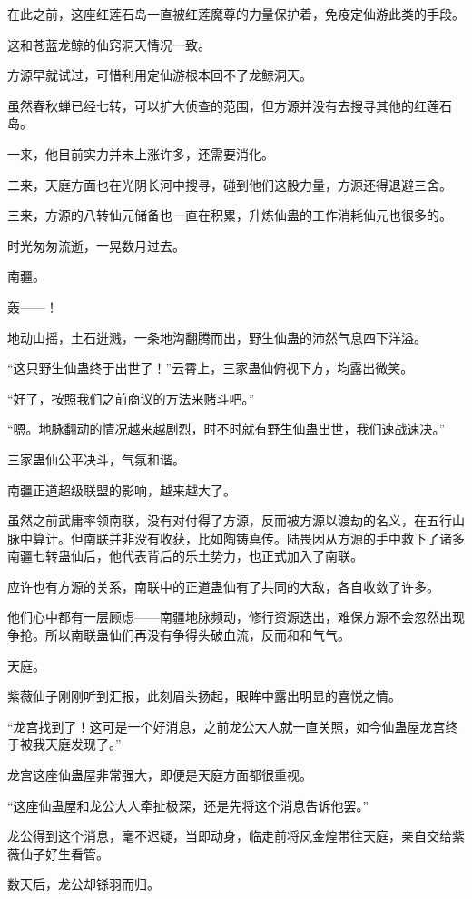 \begin{this_body}
在此之前，这座红莲石岛一直被红莲魔尊的力量保护着，免疫定仙游此类的手段。

这和苍蓝龙鲸的仙窍洞天情况一致。

方源早就试过，可惜利用定仙游根本回不了龙鲸洞天。

虽然春秋蝉已经七转，可以扩大侦查的范围，但方源并没有去搜寻其他的红莲石岛。

一来，他目前实力并未上涨许多，还需要消化。

二来，天庭方面也在光阴长河中搜寻，碰到他们这股力量，方源还得退避三舍。

三来，方源的八转仙元储备也一直在积累，升炼仙蛊的工作消耗仙元也很多的。

时光匆匆流逝，一晃数月过去。

南疆。

轰——！

地动山摇，土石迸溅，一条地沟翻腾而出，野生仙蛊的沛然气息四下洋溢。

“这只野生仙蛊终于出世了！”云霄上，三家蛊仙俯视下方，均露出微笑。

“好了，按照我们之前商议的方法来赌斗吧。”

“嗯。地脉翻动的情况越来越剧烈，时不时就有野生仙蛊出世，我们速战速决。”

三家蛊仙公平决斗，气氛和谐。

南疆正道超级联盟的影响，越来越大了。

虽然之前武庸率领南联，没有对付得了方源，反而被方源以渡劫的名义，在五行山脉中算计。但南联并非没有收获，比如陶铸真传。陆畏因从方源的手中救下了诸多南疆七转蛊仙后，他代表背后的乐土势力，也正式加入了南联。

应许也有方源的关系，南联中的正道蛊仙有了共同的大敌，各自收敛了许多。

他们心中都有一层顾虑——南疆地脉频动，修行资源迭出，难保方源不会忽然出现争抢。所以南联蛊仙们再没有争得头破血流，反而和和气气。

天庭。

紫薇仙子刚刚听到汇报，此刻眉头扬起，眼眸中露出明显的喜悦之情。

“龙宫找到了！这可是一个好消息，之前龙公大人就一直关照，如今仙蛊屋龙宫终于被我天庭发现了。”

龙宫这座仙蛊屋非常强大，即便是天庭方面都很重视。

“这座仙蛊屋和龙公大人牵扯极深，还是先将这个消息告诉他罢。”

龙公得到这个消息，毫不迟疑，当即动身，临走前将凤金煌带往天庭，亲自交给紫薇仙子好生看管。

数天后，龙公却铩羽而归。


\end{this_body}
